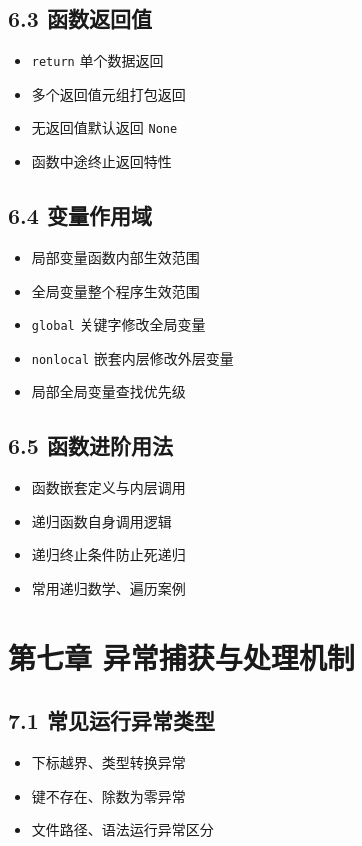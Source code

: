 \subsection{6.3 函数返回值}
\begin{itemize}
\item \texttt{return} 单个数据返回
\item 多个返回值元组打包返回
\item 无返回值默认返回 \texttt{None}
\item 函数中途终止返回特性
\end{itemize}

\subsection{6.4 变量作用域}
\begin{itemize}
\item 局部变量函数内部生效范围
\item 全局变量整个程序生效范围
\item \texttt{global} 关键字修改全局变量
\item \texttt{nonlocal} 嵌套内层修改外层变量
\item 局部全局变量查找优先级
\end{itemize}

\subsection{6.5 函数进阶用法}
\begin{itemize}
\item 函数嵌套定义与内层调用
\item 递归函数自身调用逻辑
\item 递归终止条件防止死递归
\item 常用递归数学、遍历案例
\end{itemize}

\section{第七章 异常捕获与处理机制}
\subsection{7.1 常见运行异常类型}
\begin{itemize}
\item 下标越界、类型转换异常
\item 键不存在、除数为零异常
\item 文件路径、语法运行异常区分
\end{itemize}

